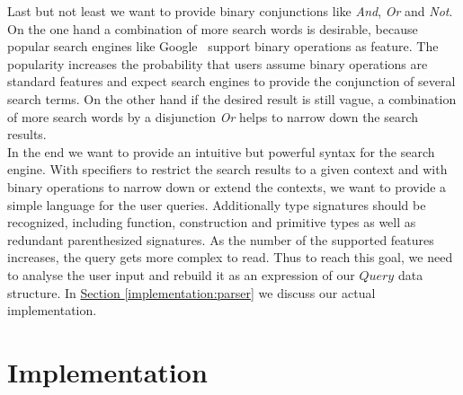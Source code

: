 \documentclass[%
	pdftex,%
	a4paper,%
	oneside,%
	chapterprefix,%
	headsepline,%
	12pt%
]{scrbook}
\newcommand{\Conid}[1]{\mathit{#1}}
\begin{document}
Last but not least we want to provide binary conjunctions like
\emph{And}, \emph{Or} and \emph{Not}. On the one hand a combination of
more search words is desirable, because popular search engines like
Google\texttrademark~ support binary operations as feature. The popularity increases the
probability that users assume binary operations are standard features
and expect search engines to provide the conjunction of several search
terms. On the other hand if the desired result is still vague, a
combination of more search words by a disjunction \emph{Or} helps to
narrow down the
search results.\\

In the end we want to provide an intuitive but powerful syntax for the
search engine. With specifiers to restrict the search results to a
given context and with binary operations to narrow down or extend the
contexts, we want to provide a simple language for the user
queries. Additionally type signatures should be recognized, including
function, construction and primitive types as well as redundant
parenthesized signatures. As the number of the supported features
increases, the query gets more complex to read. Thus to reach this
goal, we need to analyse the user input and rebuild it as an
expression of our \ensuremath{\Conid{Query}} data structure. In
\hyperref[implementation:parser]{Section \ref{implementation:parser}}
we discuss our actual implementation.

\chapter{Implementation}\label{implementation}
\end{document}
